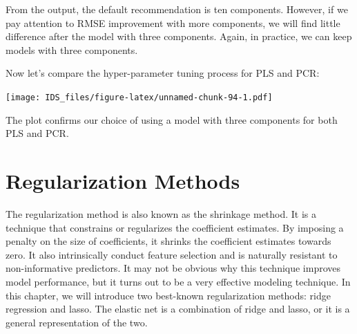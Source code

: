 \documentclass[12pt,]{krantz}
\makeatletter
\newenvironment{Shaded}{\begin{snugshade}}{\end{snugshade}}
\newcommand{\CommentTok}[1]{\textcolor[rgb]{0.37,0.37,0.37}{\textit{#1}}}
\newcommand{\DataTypeTok}[1]{\textcolor[rgb]{0.27,0.27,0.27}{#1}}
\newcommand{\DecValTok}[1]{\textcolor[rgb]{0.06,0.06,0.06}{#1}}
\newcommand{\KeywordTok}[1]{\textcolor[rgb]{0.27,0.27,0.27}{\textbf{#1}}}
\newcommand{\NormalTok}[1]{#1}
\newcommand{\OperatorTok}[1]{\textcolor[rgb]{0.43,0.43,0.43}{\textbf{#1}}}
\newcommand{\StringTok}[1]{\textcolor[rgb]{0.5,0.5,0.5}{#1}}
\newenvironment{kframe}{%
\medskip{}
\setlength{\fboxsep}{.8em}
 \def\at@end@of@kframe{}%
 \ifinner\ifhmode%
  \def\at@end@of@kframe{\end{minipage}}%
  \begin{minipage}{\columnwidth}%
 \fi\fi%
 \def\FrameCommand##1{\hskip\@totalleftmargin \hskip-\fboxsep
 \colorbox{shadecolor}{##1}\hskip-\fboxsep
     \hskip-\linewidth \hskip-\@totalleftmargin \hskip\columnwidth}%
 \MakeFramed {\advance\hsize-\width
   \@totalleftmargin\z@ \linewidth\hsize
   \@setminipage}}%
 {\par\unskip\endMakeFramed%
 \at@end@of@kframe}
\renewenvironment{Shaded}{\begin{kframe}}{\end{kframe}}
\makeatother
\begin{document}
From the output, the default recommendation is ten components. However, if we pay attention to RMSE improvement with more components, we will find little difference after the model with three components. Again, in practice, we can keep models with three components.

Now let's compare the hyper-parameter tuning process for PLS and PCR:

\begin{Shaded}
\end{Shaded}

\texttt{[image: IDS\_files/figure-latex/unnamed-chunk-94-1.pdf]}

The plot confirms our choice of using a model with three components for both PLS and PCR.

\hypertarget{regularization-methods}{%
\chapter{Regularization Methods}\label{regularization-methods}}

The regularization method is also known as the shrinkage method. It is a technique that constrains or regularizes the coefficient estimates. By imposing a penalty on the size of coefficients, it shrinks the coefficient estimates towards zero. It also intrinsically conduct feature selection and is naturally resistant to non-informative predictors. It may not be obvious why this technique improves model performance, but it turns out to be a very effective modeling technique. In this chapter, we will introduce two best-known regularization methods: ridge regression and lasso. The elastic net is a combination of ridge and lasso, or it is a general representation of the two.
\end{document}
